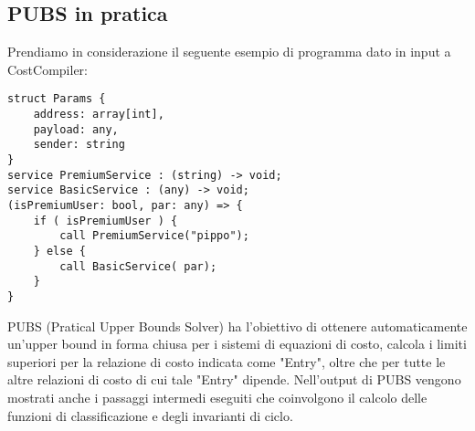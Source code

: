 \documentclass[../../main.tex]{subfiles}
\begin{document}
\subsection{PUBS in pratica}
Prendiamo in considerazione il seguente esempio di programma dato in input a CostCompiler:
\begin{lstlisting}[caption={Listing 1}]
struct Params {
	address: array[int],
	payload: any,
	sender: string
}
service PremiumService : (string) -> void;
service BasicService : (any) -> void;
(isPremiumUser: bool, par: any) => {
	if ( isPremiumUser ) {
		call PremiumService("pippo");
	} else {
		call BasicService( par);
	}
}
\end{lstlisting}

PUBS (Pratical Upper Bounds Solver) ha l'obiettivo di ottenere automaticamente un'upper bound in forma chiusa per i sistemi di equazioni di costo, calcola i limiti superiori per la relazione di costo indicata come "Entry", oltre che per tutte le altre relazioni di costo di cui tale "Entry" dipende.
Nell'output di PUBS vengono mostrati anche i passaggi intermedi eseguiti che coinvolgono il calcolo delle funzioni di classificazione e degli invarianti di ciclo.
\end{document}
